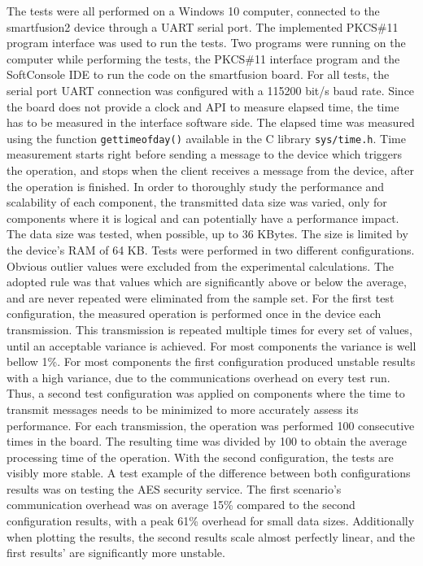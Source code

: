 The tests were all performed on a Windows 10 computer, connected to the smartfusion2 device through a \ac{UART} serial port. The implemented PKCS\#11 program interface was used to run the tests.
Two programs were running on the computer while performing the tests, the PKCS\#11 interface program and the SoftConsole IDE to run the code on the smartfusion board.
For all tests, the serial port UART connection was configured with a 115200 bit/s baud rate.%
Since the board does not provide a clock and \ac{API} to measure elapsed time, the time has to be measured in the interface software side.
The elapsed time was measured using the function \texttt{gettimeofday()} available in the C library \texttt{sys/time.h}.
Time measurement starts right before sending a message to the device which triggers the operation, and stops when the client receives a message from the device, after the operation is finished.
In order to thoroughly study the performance and scalability of each component, the transmitted data size was varied, only for components where it is logical and can potentially have a performance impact. The data size was tested, when possible, up to 36 KBytes. The size is limited by the device's \ac{RAM} of 64 KB.
Tests were performed in two different configurations.
Obvious outlier values were excluded from the experimental calculations. The adopted rule was that values which are significantly above or below the average, and are never repeated were eliminated from the sample set.
For the first test configuration, the measured operation is performed once in the device each transmission. This transmission is repeated multiple times for every set of values, until an acceptable variance is achieved. For most components the variance is well bellow 1\%. %
For most components the first configuration produced unstable results with a high variance, due to the communications overhead on every test run.
Thus, a second test configuration was applied on components where the time to transmit messages needs to be minimized to more accurately assess its performance. For each transmission, the operation was performed 100 consecutive times in the board. The resulting time was divided by 100 to obtain the average processing time of the operation.
With the second configuration, the tests are visibly more stable.
A test example of the difference between both configurations results was on testing the \ac{AES} security service. The first scenario's communication overhead was on average 15\% compared to the second configuration results, with a peak 61\% overhead for small data sizes. Additionally when plotting the results, the second results scale almost perfectly linear, and the first results' are significantly more unstable.

